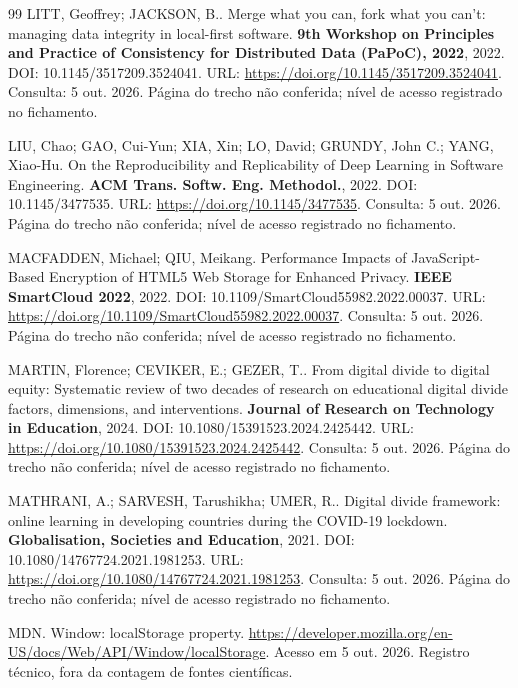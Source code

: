 \begin{thebibliography}{99}
 LITT, Geoffrey; JACKSON, B.. Merge what you can, fork what you can't: managing data integrity in local-first software. \textbf{9th Workshop on Principles and Practice of Consistency for Distributed Data (PaPoC), 2022}, 2022. DOI: 10.1145/3517209.3524041. URL: \url{https://doi.org/10.1145/3517209.3524041}. Consulta: 5 out. 2026. Página do trecho não conferida; nível de acesso registrado no fichamento.

 LIU, Chao; GAO, Cui-Yun; XIA, Xin; LO, David; GRUNDY, John C.; YANG, Xiao-Hu. On the Reproducibility and Replicability of Deep Learning in Software Engineering. \textbf{ACM Trans. Softw. Eng. Methodol.}, 2022. DOI: 10.1145/3477535. URL: \url{https://doi.org/10.1145/3477535}. Consulta: 5 out. 2026. Página do trecho não conferida; nível de acesso registrado no fichamento.

 MACFADDEN, Michael; QIU, Meikang. Performance Impacts of JavaScript-Based Encryption of HTML5 Web Storage for Enhanced Privacy. \textbf{IEEE SmartCloud 2022}, 2022. DOI: 10.1109/SmartCloud55982.2022.00037. URL: \url{https://doi.org/10.1109/SmartCloud55982.2022.00037}. Consulta: 5 out. 2026. Página do trecho não conferida; nível de acesso registrado no fichamento.

 MARTIN, Florence; CEVIKER, E.; GEZER, T.. From digital divide to digital equity: Systematic review of two decades of research on educational digital divide factors, dimensions, and interventions. \textbf{Journal of Research on Technology in Education}, 2024. DOI: 10.1080/15391523.2024.2425442. URL: \url{https://doi.org/10.1080/15391523.2024.2425442}. Consulta: 5 out. 2026. Página do trecho não conferida; nível de acesso registrado no fichamento.

 MATHRANI, A.; SARVESH, Tarushikha; UMER, R.. Digital divide framework: online learning in developing countries during the COVID-19 lockdown. \textbf{Globalisation, Societies and Education}, 2021. DOI: 10.1080/14767724.2021.1981253. URL: \url{https://doi.org/10.1080/14767724.2021.1981253}. Consulta: 5 out. 2026. Página do trecho não conferida; nível de acesso registrado no fichamento.

 MDN. Window: localStorage property. \url{https://developer.mozilla.org/en-US/docs/Web/API/Window/localStorage}. Acesso em 5 out. 2026. Registro técnico, fora da contagem de fontes científicas.


\end{thebibliography}
